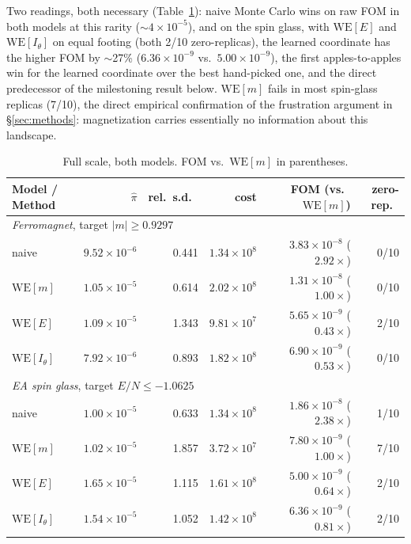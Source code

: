 \documentclass[a4paper,fleqn]{cas-sc}
\begin{document}
	
	Two readings, both necessary (Table~\ref{tab:prefix}): naive Monte Carlo wins on raw FOM in both models at this
	rarity ($\sim\!4\times10^{-5}$), and on the spin glass, with $\mathrm{WE}[E]$ and
	$\mathrm{WE}[I_\theta]$ on equal footing (both 2/10 zero-replicas), the learned
	coordinate has the higher FOM by $\sim$27\% ($6.36\times10^{-9}$ vs.\ $5.00\times10^{-9}$),
	the first apples-to-apples win for the learned coordinate over the best hand-picked
	one, and the direct predecessor of the milestoning result below. $\mathrm{WE}[m]$ fails in
	most spin-glass replicas (7/10), the direct empirical confirmation of the frustration
	argument in \S\ref{sec:methods}: magnetization carries essentially no information about
	this landscape.
	\begin{table}[H]
		\centering\small
		\caption{Full scale, both models. FOM vs.\ $\mathrm{WE}[m]$ in parentheses.}
		\label{tab:prefix}
		\setlength{\tabcolsep}{4pt}
		\begin{tabular}{lrrrrr}
			\toprule
			Model / Method & $\hat\pi$ & rel.\ s.d.\ & cost & FOM (vs.\ $\mathrm{WE}[m]$) & zero-rep.\ \\
			\midrule
			\multicolumn{6}{l}{\emph{Ferromagnet}, target $|m|\ge0.9297$} \\
			naive & $9.52\times10^{-6}$ & 0.441 & $1.34\times10^{8}$ & $3.83\times10^{-8}$ ($2.92\times$) & 0/10 \\
			$\mathrm{WE}[m]$ & $1.05\times10^{-5}$ & 0.614 & $2.02\times10^{8}$ & $1.31\times10^{-8}$ ($1.00\times$) & 0/10 \\
			$\mathrm{WE}[E]$ & $1.09\times10^{-5}$ & 1.343 & $9.81\times10^{7}$ & $5.65\times10^{-9}$ ($0.43\times$) & 2/10 \\
			$\mathrm{WE}[I_\theta]$ & $7.92\times10^{-6}$ & 0.893 & $1.82\times10^{8}$ & $6.90\times10^{-9}$ ($0.53\times$) & 0/10 \\
			\multicolumn{6}{l}{\emph{EA spin glass}, target $E/N\le-1.0625$} \\
			naive & $1.00\times10^{-5}$ & 0.633 & $1.34\times10^{8}$ & $1.86\times10^{-8}$ ($2.38\times$) & 1/10 \\
			$\mathrm{WE}[m]$ & $1.02\times10^{-5}$ & 1.857 & $3.72\times10^{7}$ & $7.80\times10^{-9}$ ($1.00\times$) & 7/10 \\
			$\mathrm{WE}[E]$ & $1.65\times10^{-5}$ & 1.115 & $1.61\times10^{8}$ & $5.00\times10^{-9}$ ($0.64\times$) & 2/10 \\
			$\mathrm{WE}[I_\theta]$ & $1.54\times10^{-5}$ & 1.052 & $1.42\times10^{8}$ & $6.36\times10^{-9}$ ($0.81\times$) & 2/10 \\
			\bottomrule
		\end{tabular}
	\end{table}
	
\end{document}
